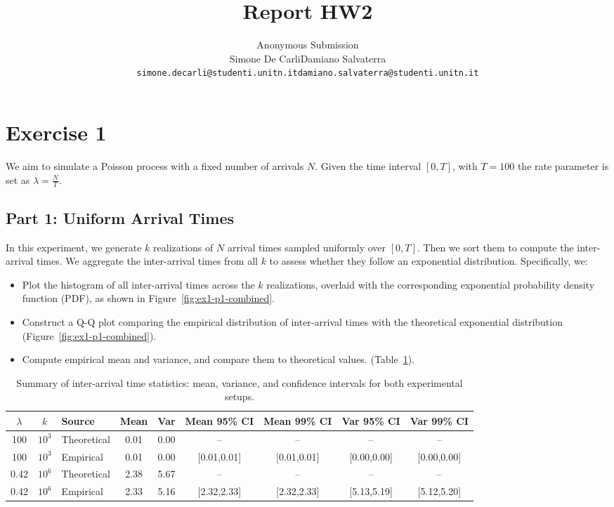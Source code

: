 \documentclass[a4paper]{article}
\title{Report HW2}
\author{%
  \ifdefined\anonymous%
  Anonymous Submission
  \else
  \begin{tabular}{cc}
    Simone De Carli & Damiano Salvaterra \\
    {\small\texttt{simone.decarli@studenti.unitn.it}} &
    {\small\texttt{damiano.salvaterra@studenti.unitn.it}}
  \end{tabular}
  \fi
}
\date{}  %
\begin{document}
\maketitle

\section*{Exercise 1}

We aim to simulate a Poisson process with a fixed number of arrivals
$N$. Given the time interval $[0, T]$, with $T = 100$ the rate
parameter is set as $\lambda = \frac{N}{T}$.

\subsection*{Part 1: Uniform Arrival Times}

In this experiment, we generate $k$ realizations of $N$ arrival times
sampled uniformly over $[0, T]$. Then we sort them to compute the
inter-arrival times.
We aggregate the inter-arrival times from all $k$ to assess whether
they follow an exponential distribution. Specifically, we:

\begin{itemize}
    \setlength\itemsep{0.01em}
  \item Plot the histogram of all inter-arrival times across the $k$
    realizations, overlaid with the corresponding exponential
    probability density function (PDF), as shown in
    Figure~\ref{fig:ex1-p1-combined}.
  \item Construct a Q-Q plot comparing the empirical distribution of
    inter-arrival times with the theoretical exponential distribution
    (Figure~\ref{fig:ex1-p1-combined}).
  \item Compute empirical mean and variance, and compare them to
    theoretical values. (Table~\ref{tab:ex1-p1-ci-summary}).
\end{itemize}

\begin{table}[htbp]
  \centering
  \small
  \begin{tabular}{@{}cc|lcccccc@{}}
    \toprule
    $\lambda$ & $k$ & Source & Mean & Var & Mean 95\% CI & Mean 99\%
    CI & Var 95\% CI & Var 99\% CI \\
    \midrule
    100 & $10^3$ & Theoretical & 0.01 & 0.00 & -- & -- & -- & -- \\
    100 & $10^3$ & Empirical   & 0.01 & 0.00 & [0.01,0.01] &
    [0.01,0.01] & [0.00,0.00] & [0.00,0.00] \\
    \midrule
    0.42 & $10^6$ & Theoretical & 2.38 & 5.67 & -- & -- & -- & -- \\
    0.42 & $10^6$ & Empirical   & 2.33 & 5.16 & [2.32,2.33] &
    [2.32,2.33] & [5.13,5.19] & [5.12,5.20] \\
    \bottomrule
  \end{tabular}
  \caption{Summary of inter-arrival time statistics: mean, variance,
    and confidence intervals for both experimental
  setups.}\label{tab:ex1-p1-ci-summary}
\end{table}
\end{document}
